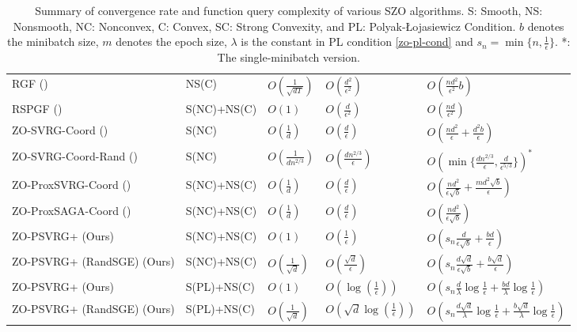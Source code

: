 \begin{table*}[t]
\begin{center}
\begin{tabular}{ |l|l|l|l|l| }
 RGF (\cite{nesterov2017random}) & NS(C) & $O\left(\frac{1}{\sqrt{dT}}\right)$ & $O\left(\frac{d^2}{\epsilon^2}\right)$ &$O\left(\frac{nd^2}{\epsilon^2}b\right)$\\
 RSPGF (\cite{ghadimi2016accelerated}) & S(NC)+NS(C) & $O\left(1\right)$ & $O\left(\frac{d}{\epsilon^2}\right)$ &$O\left(\frac{nd}{\epsilon^2}\right)$\\ 
 ZO-SVRG-Coord (\cite{liu2018zeroth}) & S(NC)& $O\left(\frac{1}{{d}}\right)$ & $O\left(\frac{d}{\epsilon}\right)$ & $O(\frac{nd^2}{\epsilon}+\frac{d^2b}{\epsilon})$\\
 ZO-SVRG-Coord-Rand (\cite{ji2019improved}) & S(NC)& $O\left(\frac{1}{{dn^{2/3}}}\right)$ & $O\left(\frac{dn^{2/3}}{\epsilon}\right)$ & $O(\min\{\frac{dn^{2/3}}{\epsilon},\frac{d}{\epsilon^{5/3}}\})^{*}$\\
  ZO-ProxSVRG-Coord (\cite{huang2019faster}) & S(NC)+NS(C) & $O\left(\frac{1}{{d}}\right)$ & $O\left(\frac{d}{\epsilon}\right)$ & $O(\frac{nd^2}{\epsilon\sqrt{b}}+\frac{md^2\sqrt{b}}{\epsilon})$\\
   ZO-ProxSAGA-Coord (\cite{huang2019faster}) & S(NC)+NS(C)& $O\left(\frac{1}{{d}}\right)$ & $O\left(\frac{d}{\epsilon}\right)$ & $O(\frac{nd^2}{\epsilon\sqrt{b}})$\\
   ZO-PSVRG+ (Ours)  & S(NC)+NS(C) & $O\left(1\right)$ & $O\left(\frac{1}{\epsilon}\right)$ & $O\left(s_n\frac{d}{\epsilon \sqrt{b}}+\frac{bd}{\epsilon}\right)$\\
   ZO-PSVRG+ (RandSGE) (Ours)  & S(NC)+NS(C) & $O\left(\frac{1}{\sqrt{d}}\right)$ & $O\left(\frac{\sqrt{d}}{\epsilon}\right)$ & $O\left(s_n\frac{d\sqrt{d}}{\epsilon \sqrt{b}}+\frac{b\sqrt{d}}{\epsilon}\right)$\\
   ZO-PSVRG+ (Ours) & S(PL)+NS(C) & $O\left(1\right)$ & $O\left(\log(\frac{1}{\epsilon})\right)$ & {$O(s_n \frac{d}{\lambda}\log\frac{1}{\epsilon}+\frac{bd}{\lambda}\log\frac{1}{\epsilon})$}\\
   ZO-PSVRG+ (RandSGE) (Ours) & S(PL)+NS(C) & $O\left(\frac{1}{\sqrt{d}}\right)$ & $O\left(\sqrt{d}\log(\frac{1}{\epsilon})\right)$ & {$O(s_n\frac{d\sqrt{d}}{\lambda}\log\frac{1}{\epsilon}+\frac{b\sqrt{d}}{\lambda}\log\frac{1}{\epsilon})$}\\
 \hline
\end{tabular}
\caption{Summary of convergence rate and function query complexity of various SZO algorithms. S: Smooth, NS: Nonsmooth, NC: Nonconvex, C: Convex, SC: Strong Convexity, and PL: Polyak-Łojasiewicz Condition. $b$ denotes the minibatch size, $m$ denotes the epoch size, $\lambda$ is the constant in PL condition \eqref{zo-pl-cond} and $s_n = \min\{n, \frac{1}{\epsilon}\}$. *: The single-minibatch version.}
\label{table-compare}
\end{center}
\end{table*}

